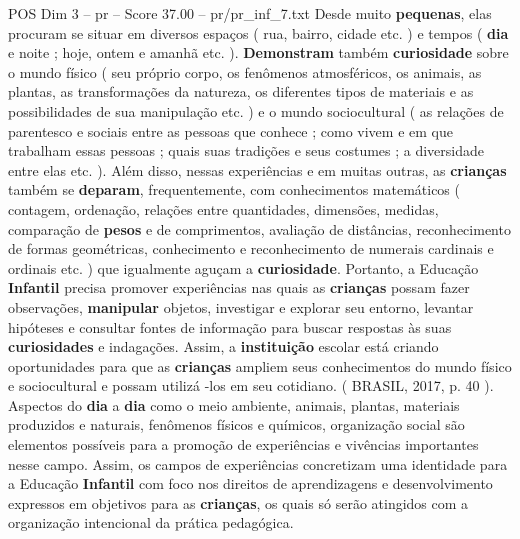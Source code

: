 \begin{textsample}{POS Dim 3 – pr – Score 37.00 – pr/pr\_inf\_7.txt}
Desde muito \textbf{pequenas}, elas procuram se situar em diversos espaços ( rua, bairro, cidade etc. ) e tempos ( \textbf{dia} e noite ; hoje, ontem e amanhã etc. ). \textbf{Demonstram} também \textbf{curiosidade} sobre o mundo físico ( seu próprio corpo, os fenômenos atmosféricos, os animais, as plantas, as transformações da natureza, os diferentes tipos de materiais e as possibilidades de sua manipulação etc. ) e o mundo sociocultural ( as relações de parentesco e sociais entre as pessoas que conhece ; como vivem e em que trabalham essas pessoas ; quais suas tradições e seus costumes ; a diversidade entre elas etc. ).
Além disso, nessas experiências e em muitas outras, as \textbf{crianças} também se \textbf{deparam}, frequentemente, com conhecimentos matemáticos ( contagem, ordenação, relações entre quantidades, dimensões, medidas, comparação de \textbf{pesos} e de comprimentos, avaliação de distâncias, reconhecimento de formas geométricas, conhecimento e reconhecimento de numerais cardinais e ordinais etc. ) que igualmente aguçam a \textbf{curiosidade}.
Portanto, a Educação \textbf{Infantil} precisa promover experiências nas quais as \textbf{crianças} possam fazer observações, \textbf{manipular} objetos, investigar e explorar seu entorno, levantar hipóteses e consultar fontes de informação para buscar respostas às suas \textbf{curiosidades} e indagações.
Assim, a \textbf{instituição} escolar está criando oportunidades para que as \textbf{crianças} ampliem seus conhecimentos do mundo físico e sociocultural e possam utilizá -los em seu cotidiano. ( BRASIL, 2017, p. 40 ).
Aspectos do \textbf{dia} a \textbf{dia} como o meio ambiente, animais, plantas, materiais produzidos e naturais, fenômenos físicos e químicos, organização social são elementos possíveis para a promoção de experiências e vivências importantes nesse campo.
Assim, os campos de experiências concretizam uma identidade para a Educação \textbf{Infantil} com foco nos direitos de aprendizagens e desenvolvimento expressos em objetivos para as \textbf{crianças}, os quais só serão atingidos com a organização intencional da prática pedagógica.

\end{textsample}
